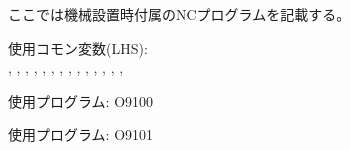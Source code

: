\setcounter{lstlisting}{0}

ここでは機械設置時付属のNCプログラムを記載する。



\begin{hosoku}\small
使用コモン変数(LHS):\\
, , , , , , , , , , , , , , 
\end{hosoku}


\clearpage

\begin{hosoku}\small
使用プログラム: O9100
\end{hosoku}



\begin{hosoku}\small
使用プログラム: O9101
\end{hosoku}


